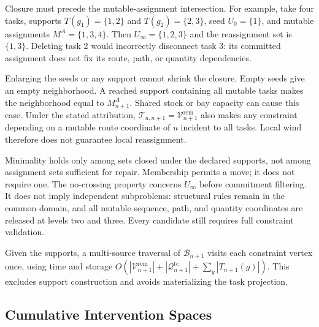 Closure must precede the mutable-assignment intersection. For example,
take four tasks, supports $T(g_1)=\{1,2\}$ and $T(g_2)=\{2,3\}$, seed
$U_0=\{1\}$, and mutable assignments $M^A=\{1,3,4\}$.
Then $U_\infty=\{1,2,3\}$ and the reassignment set is $\{1,3\}$.
Deleting task 2 would incorrectly disconnect task 3: its committed
assignment does not fix its route, path, or quantity dependencies.

Enlarging the seeds or any support cannot shrink the closure. Empty seeds
give an empty neighborhood. A reached support containing all mutable tasks
makes the neighborhood equal to $M_{n+1}^A$. Shared stock or bay capacity
can cause this case. Under the stated attribution,
$\mathcal T_{u,n+1}=\mathcal V_{n+1}^{\mathrm{rem}}$ also makes any
constraint depending on a mutable route coordinate of $u$ incident to all
tasks. Local wind therefore does not guarantee local reassignment.

Minimality holds only among sets closed under the declared supports, not
among assignment sets sufficient for repair. Membership permits a move;
it does not require one. The no-crossing property concerns $U_\infty$
before commitment filtering. It does not imply independent subproblems:
structural rules remain in the common domain, and all mutable sequence,
path, and quantity coordinates are released at levels two and three.
Every candidate still requires full constraint validation.

Given the supports, a multi-source traversal of $\mathcal B_{n+1}$ visits
each constraint vertex once, using time and storage
$O(|\mathcal V_{n+1}^{\mathrm{rem}}|+|\mathcal Q_{n+1}^{\mathrm{tc}}|
+\sum_g|T_{n+1}(g)|)$. This excludes support construction and avoids
materializing the task projection.

\subsection{Cumulative Intervention Spaces}
\label{subsec:intervention_spaces}

